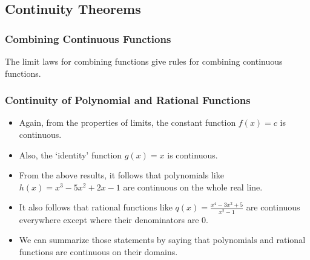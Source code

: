 \documentclass[serif,ignorenonframetext]{beamer}
\newcommand{\ds}{\displaystyle}
\begin{document}
\subsection{Continuity Theorems}

\begin{frame}
  \frametitle{Combining Continuous Functions}
  The limit laws for combining functions give rules for combining
  continuous functions.
  \begin{enumerate}
  \end{enumerate}
\end{frame}

\begin{frame}
  \frametitle{Continuity of Polynomial and Rational Functions}
  \begin{itemize}
  \item Again, from the properties of limits,
    the constant function $\ds f(x)=c$ is continuous.
  \pause
  \item Also, the `identity' function $\ds g(x)=x$ is continuous.
  \pause
  \item From the above results, it follows that polynomials 
    like $\ds h(x)=x^3-5x^2+2x-1$ are continuous on the whole real line.
  \pause
  \item It also follows that rational functions like 
    $\ds q(x)= \frac{x^4-3x^2+5}{x^2-1}$ are continuous everywhere 
    except where their denominators are $0$.
  \pause
  \item We can summarize those statements by saying that polynomials
    and rational functions are continuous on their domains.
  \end{itemize}
\end{frame}
\end{document}
